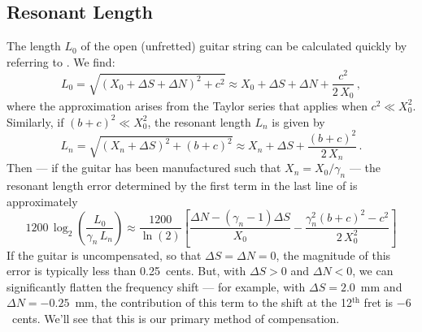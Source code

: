  \subsection{Resonant Length}
The length $L_0$ of the open (unfretted) guitar string can be calculated quickly by referring to . We find:
 \begin{equation}  \label{eqn:l_0_def}
L_0 = \sqrt{\left(X_0 + \Delta S + \Delta N\right)^2 + c^2} \approx X_0 + \Delta S + \Delta N + \frac{c^2}{2\, X_0}\, ,
 \end{equation}
where the approximation arises from the Taylor series that applies when $c^2 \ll X_0^2$. Similarly, if $(b + c)^2 \ll X_0^2$, the resonant length $L_n$ is given by
 \begin{equation}  \label{eqn:l_n_def}
L_n = \sqrt{\left(X_n + \Delta S\right)^2 + (b + c)^2} \approx X_n + \Delta S + \frac{(b + c)^2}{2\, X_n}\, .
 \end{equation}
Then --- if the guitar has been manufactured such that $X_n = X_0 / \gamma_n$ --- the resonant length error determined by the first term in the last line of  is approximately
  \begin{equation} \label{eqn:rle_approx}
  1200\, \log_2 \left( \frac{L_0}{\gamma_n\, L_n} \right) \approx \frac{1200}{\ln(2)} \left[ \frac{\Delta N - \left(\gamma_n - 1\right) \Delta S}{X_0} - \frac{\gamma_n^2 (b + c)^2 - c^2}{2\, X_0^2}\right]
  \end{equation}
If the guitar is uncompensated, so that $\Delta S = \Delta N = 0$, the magnitude of this error is typically less than 0.25~cents. But, with $\Delta S > 0$ and $\Delta N < 0$, we can significantly flatten the frequency shift --- for example, with $\Delta S = 2.0$~mm and $\Delta N = -0.25$~mm, the contribution of this term to the shift at the 12$^\text{th}$ fret is $-6$~cents. We'll see that this is our primary method of compensation.

